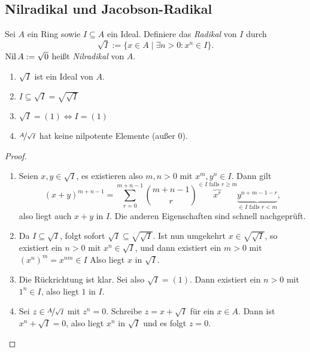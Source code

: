 \documentclass[12pt,a4paper]{scrartcl}
\theoremstyle{cplain}
\theoremstyle{cdef}
\begin{document}
\subsection{Nilradikal und Jacobson-Radikal}
\begin{defi}
    Sei $A$ ein Ring sowie $I\subseteq A$ ein Ideal. Definiere das \emph{Radikal} von $I$ durch \[\sqrt{I} := \{x\in A \mid \exists n>0: x^n\in I\}.\]
    $\operatorname{Nil} A := \sqrt{0}$ heißt \emph{Nilradikal} von $A$.
\end{defi}
\begin{lem}
    \leavevmode
    \begin{enumerate}
        \item $\sqrt{I}$ ist ein Ideal von $A$. \label{lem:radikal:i}
        \item $I\subseteq \sqrt{I} = \sqrt{\sqrt{I}}$ \label{lem:radikal:ii}
        \item $\sqrt{I} = (1) \Leftrightarrow I = (1)$ \label{lem:radikal:iii}
        \item $\nicefrac{A}{\sqrt{I}}$ hat keine nilpotente Elemente (außer 0). \label{lem:radikal:iv}
    \end{enumerate}
\end{lem}
\begin{proof}
	\leavevmode
	\begin{enumerate}[label=\ref{lem:radikal:\roman*}]
		\item Seien $x, y\in \sqrt{I}$, es existieren also $m, n > 0$ mit $x^m, y^n\in I$. Dann gilt
		\[(x+y)^{m+n-1}=\sum_{r=0}^{m+n-1}{m+n-1 \choose r}\overbrace{x^r}^{\in I \text{ falls } r\ge m}\underbrace{y^{n+m-1-r}}_{\in I \text{ falls } r<m},\]
		also liegt auch $x+y$ in $I$. Die anderen Eigenschaften sind schnell nachgeprüft.
		\item Da $I\subseteq \sqrt{I}$, folgt sofort $\sqrt{I} \subseteq \sqrt{\sqrt{I}}$. Ist nun umgekehrt $x\in \sqrt{\sqrt{I}}$, so existiert ein $n>0$ mit $x^n\in \sqrt{I}$, und dann existiert ein $m>0$ mit $(x^n)^m = x^{nm} \in I$ Also liegt $x$ in $\sqrt{I}$.
		\item Die Rückrichtung ist klar. Sei also $\sqrt I=(1)$. Dann existiert ein $n>0$ mit $1^n \in I$, also liegt $1$ in $I$.
		\item Sei $z\in \nicefrac{A}{\sqrt{I}}$ mit $z^n=0$. Schreibe $z=x+\sqrt{I}$ für ein $x\in A$. Dann ist $x^n+\sqrt{I} = 0$, also liegt $x^n$ in $\sqrt{I}$ und es folgt $z=0$.
		\qedhere
	\end{enumerate}
\end{proof}
\end{document}
